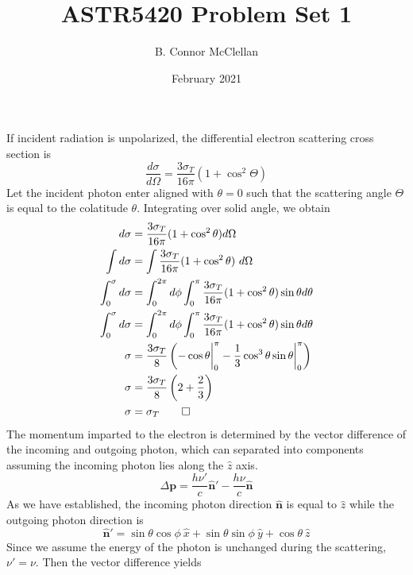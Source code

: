 \documentclass{article}
\title{ASTR5420 Problem Set 1}
\author{B. Connor McClellan}
\date{February 2021}
\begin{document}
\maketitle


\section{}
If incident radiation is unpolarized, the differential electron scattering cross section is
%
\begin{equation}
    \frac{d\sigma}{d\Omega} = \frac{3 \sigma_T}{16\pi}(1 + \cos^2 \Theta)
\end{equation}
%
Let the incident photon enter aligned with $\theta=0$ such that the scattering angle $\Theta$ is equal to the colatitude $\theta$.  Integrating over solid angle, we obtain
%
\begin{equation*} \label{exsec}
    \begin{split}
        d\sigma &= \frac{3 \sigma_T}{16\pi}(1 + \cos^2 \theta) d\Omega\\
        \int d\sigma &= \int \frac{3 \sigma_T}{16\pi}(1 + \cos^2 \theta)\ d\Omega \\
        \int_0^\sigma d\sigma &= \int_0^{2\pi}d\phi\int_0^\pi \frac{3 \sigma_T}{16\pi}(1 + \cos^2 \theta)\sin \theta d\theta \\
        \int_0^\sigma d\sigma &= \int_0^{2\pi}d\phi\int_0^\pi \frac{3 \sigma_T}{16\pi}(1 + \cos^2 \theta)\sin \theta d\theta \\
        \sigma &= \frac{3 \sigma_T}{8} \left( -\cos \theta \bigg\rvert_0^\pi - \frac{1}{3}\cos^3 \theta \sin \theta \bigg\rvert_0^\pi\right)\\
        \sigma &= \frac{3 \sigma_T}{8} \left(2 + \frac{2}{3}\right)\\
        \sigma &= \sigma_T \qed
    \end{split}
\end{equation*}
%
The momentum imparted to the electron is determined by the vector difference of the incoming and outgoing photon, which can separated into components assuming the incoming photon lies along the $\hat{z}$ axis.
%
\begin{equation}
    \Delta \mathbf{p} = \frac{h\nu'}{c} \mathbf{\hat n'} - \frac{h\nu}{c}\mathbf{\hat n}
\end{equation}
%
As we have established, the incoming photon direction $\mathbf{\hat n}$ is equal to $\hat{z}$ while the outgoing photon direction is 
%
\begin{equation}
    \mathbf{\hat n'} = \sin \theta \cos{\phi}\ \hat{x} + \sin \theta \sin \phi\ \hat{y}  + \cos \theta \ \hat{z}
\end{equation}
%
Since we assume the energy of the photon is unchanged during the scattering, $\nu' = \nu$. Then the vector difference yields
\end{document}
